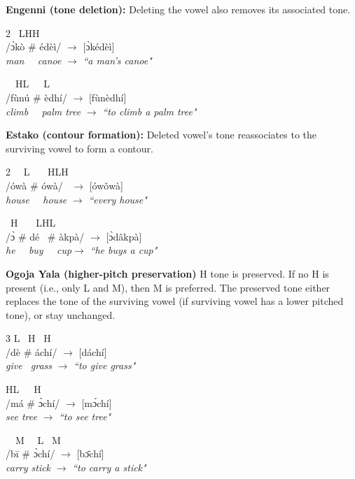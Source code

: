 \documentclass{article}[12pt]
\begin{document}
\ea 
\textbf{Engenni (tone deletion):} 
Deleting the vowel also removes its associated tone.
\vspace{-1em}
\begin{multicols}{2}
\quad\ L\quad H\qquad\qquad H\\
 /\` ɔkò \# édèì/ $\rightarrow$ [\` ɔkédèì] \\
 \textit{man \ \ canoe} $\rightarrow$ \textit{``a man’s canoe"} 
 
 \quad\ \ H\quad L\qquad\qquad\ \ \ L\\
/fùnú \# èdhí/ $\rightarrow$ [fùnèdhí] \\
\textit{climb \ \ palm tree} $\rightarrow$ \textit{``to climb a palm tree"}
\end{multicols}
\z \vspace{-1em}
\ea \textbf{Estako (contour formation):} 
Deleted vowel’s tone reassociates to the surviving vowel to form a contour.
\vspace{-1em}
\begin{multicols}{2}
\quad\ \ L \ \ \ H\qquad\qquad LH\\
/ówà \# ówà/ \ $\rightarrow$ [ówǒwà] \\
\textit{house \ \ house} $\rightarrow$ \textit{``every house"}

\qquad\ H \ \ \ L\qquad\qquad HL\\
/\`ɔ \# dé \ \# àkpà/ $\rightarrow$ [\`ɔdâkpà] \\
\textit{he \ \ buy \ \ cup}\quad$\rightarrow$ \textit{``he buys a cup"}
\end{multicols}
\z\vspace{-1em}
\ea \textbf{Ogoja Yala (higher-pitch preservation)}
H tone is preserved. 
If no H is present (i.e., only L and M), then M is preferred.
The preserved tone either replaces the tone of the surviving vowel 
(if surviving vowel has a lower pitched tone), or stay unchanged.
\vspace{-1em}
\begin{multicols}{3}
\quad L \; \  H \qquad \quad \ H\\
/dè \# áchí/ $\rightarrow$ [dáchí]\\
\textit{give \ grass} $\rightarrow$ \textit{``to give grass"}

\quad H\quad L\qquad\ \ \ \quad H\\
/má \# \` ɔchí/ $\rightarrow$ [m\' ɔchí]\\
\vspace{1em}\textit{see \quad tree} $\rightarrow$ \textit{``to see tree"}

\ \ M \ \ L \qquad \quad \ M\\
/b\=i \# \` ɔchí/ $\rightarrow$ [b\=ɔchí]\\
\textit{carry  stick} $\rightarrow$ \textit{``to carry a stick"}
\end{multicols}
\z\vspace{-1em}
\end{document}
